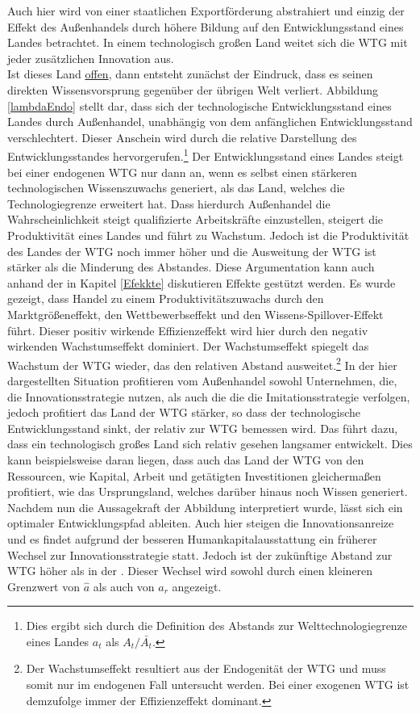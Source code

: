 Auch hier wird von einer staatlichen Exportförderung abstrahiert und einzig der Effekt des Au{\ss}enhandels durch höhere Bildung auf den Entwicklungsstand eines Landes betrachtet. In einem technologisch gro{\ss}en Land weitet sich die WTG mit jeder zusätzlichen Innovation aus.\\ Ist dieses Land \underline{offen}, dann entsteht zunächst der Eindruck, dass es seinen direkten Wissensvorsprung gegenüber der übrigen Welt verliert. Abbildung \ref{lambdaEndo} stellt dar, dass sich der technologische Entwicklungsstand eines Landes durch Au{\ss}enhandel, unabhängig von dem anfänglichen Entwicklungsstand verschlechtert. Dieser Anschein wird durch die relative Darstellung des Entwicklungsstandes hervorgerufen.\footnote{Dies ergibt sich durch die Definition des Abstands zur Welttechnologiegrenze eines Landes $a_t$ als $A_t/\bar{A_t}$.} Der Entwicklungsstand eines Landes steigt bei einer endogenen WTG nur dann an, wenn es selbst einen stärkeren technologischen Wissenszuwachs generiert, als das Land, welches die Technologiegrenze erweitert hat. Dass hierdurch Au{\ss}enhandel die Wahrscheinlichkeit steigt qualifizierte Arbeitskräfte einzustellen, steigert die Produktivität eines Landes und führt zu Wachstum. Jedoch ist die Produktivität des Landes der WTG noch immer höher und die Ausweitung der WTG ist stärker als die Minderung des Abstandes. Diese Argumentation kann auch anhand der in Kapitel \ref{Efekkte} diskutieren Effekte gestützt werden. Es wurde gezeigt, dass Handel zu einem Produktivitätszuwachs durch den Marktgrö{\ss}eneffekt, den Wettbewerbseffekt und den Wissens-Spillover-Effekt führt. Dieser positiv wirkende Effizienzeffekt wird hier durch den negativ wirkenden Wachstumseffekt dominiert. Der Wachstumseffekt spiegelt das Wachstum der WTG wieder, das den relativen Abstand ausweitet.\footnote{Der Wachstumseffekt resultiert aus der Endogenität der WTG und muss somit nur im endogenen Fall untersucht werden. Bei einer exogenen WTG ist demzufolge immer der Effizienzeffekt dominant.} In der hier dargestellten Situation profitieren vom Au{\ss}enhandel sowohl Unternehmen, die, die \textcolor[rgb]{0.74,0.97,0.22}{Innovationsstrategie} nutzen, als auch die die die \textcolor[rgb]{0,0.32,0}{Imitationsstrategie} verfolgen, jedoch profitiert das Land der WTG stärker, so dass der technologische Entwicklungsstand sinkt, der relativ zur WTG bemessen wird. Das führt dazu, dass ein technologisch gro{\ss}es Land sich relativ gesehen langsamer entwickelt. Dies kann beispielsweise daran liegen, dass auch das Land der WTG von den Ressourcen, wie Kapital, Arbeit und getätigten Investitionen gleicherma{\ss}en profitiert, wie das Ursprungsland, welches darüber hinaus noch Wissen generiert.\\
Nachdem nun die Aussagekraft der Abbildung interpretiert wurde, lässt sich ein optimaler Entwicklungspfad ableiten. Auch hier steigen die Innovationsanreize und es findet aufgrund der besseren Humankapitalausstattung ein früherer Wechsel zur \textcolor[rgb]{0.74,0.97,0.22}{Innovationsstrategie} statt. Jedoch ist der zukünftige Abstand zur WTG höher als in der . Dieser Wechsel wird sowohl durch einen kleineren Grenzwert von $\hat{a}$ als auch von $a_r$ angezeigt.
\bigskip


